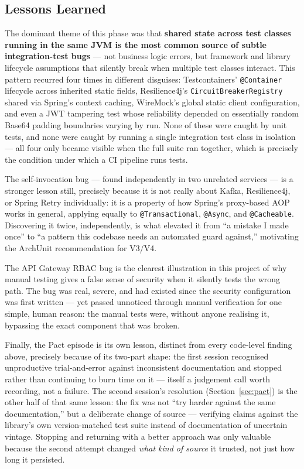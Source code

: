 \subsection{Lessons Learned}

The dominant theme of this phase was that \textbf{shared state across test classes running in the same JVM is the most common source of subtle integration-test bugs} --- not business logic errors, but framework and library lifecycle assumptions that silently break when multiple test classes interact. This pattern recurred four times in different disguises: Testcontainers' \texttt{@Container} lifecycle across inherited static fields, Resilience4j's \texttt{CircuitBreakerRegistry} shared via Spring's context caching, WireMock's global static client configuration, and even a JWT tampering test whose reliability depended on essentially random Base64 padding boundaries varying by run. None of these were caught by unit tests, and none were caught by running a single integration test class in isolation --- all four only became visible when the full suite ran together, which is precisely the condition under which a CI pipeline runs tests.

The self-invocation bug --- found independently in two unrelated services --- is a stronger lesson still, precisely because it is not really about Kafka, Resilience4j, or Spring Retry individually: it is a property of how Spring's proxy-based AOP works in general, applying equally to \texttt{@Transactional}, \texttt{@Async}, and \texttt{@Cacheable}. Discovering it twice, independently, is what elevated it from ``a mistake I made once'' to ``a pattern this codebase needs an automated guard against,'' motivating the ArchUnit recommendation for V3/V4.

The API Gateway RBAC bug is the clearest illustration in this project of why manual testing gives a false sense of security when it silently tests the wrong path. The bug was real, severe, and had existed since the security configuration was first written --- yet passed unnoticed through manual verification for one simple, human reason: the manual tests were, without anyone realising it, bypassing the exact component that was broken.

Finally, the Pact episode is its own lesson, distinct from every code-level finding above, precisely because of its two-part shape: the first session recognised unproductive trial-and-error against inconsistent documentation and stopped rather than continuing to burn time on it --- itself a judgement call worth recording, not a failure. The second session's resolution (Section~\ref{sec:pact}) is the other half of that same lesson: the fix was not ``try harder against the same documentation,'' but a deliberate change of source --- verifying claims against the library's own version-matched test suite instead of documentation of uncertain vintage. Stopping and returning with a better approach was only valuable because the second attempt changed \emph{what kind of source} it trusted, not just how long it persisted.